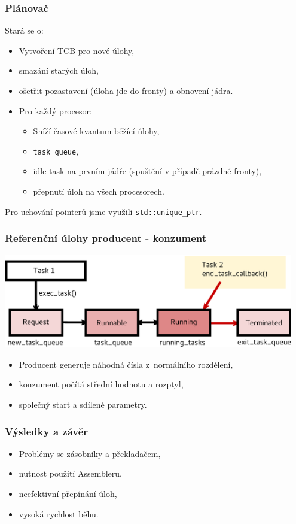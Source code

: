\documentclass{beamer}
\begin{document}
\begin{frame}
\frametitle{Plánovač}

Stará se o:
\begin{itemize}
  \item Vytvoření TCB pro nové úlohy,
  \item smazání starých úloh,
  \item ošetřit pozastavení (úloha jde do fronty) a obnovení jádra.
  \item Pro každý procesor:
  \begin{itemize}
    \item Sníží časové kvantum běžící úlohy,
    \item \texttt{task\_queue},
    \item idle task na prvním jádře (spuštění v případě prázdné fronty),
    \item přepnutí úloh na všech procesorech.
  \end{itemize}

\end{itemize}
Pro uchování pointerů jsme využili \texttt{std::unique\_ptr}.
\end{frame}

\begin{frame} %

\frametitle{Referenční úlohy producent - konzument}

\includegraphics[width=0.95\textwidth]{obrazky/task_cycle.eps}
  
  \begin{itemize}
    \item Producent generuje náhodná čísla z~normálního rozdělení,
    \item konzument počítá střední hodnotu a rozptyl,
    \item společný start a sdílené parametry.
  \end{itemize}

\end{frame}

\begin{frame} 
\frametitle{Výsledky a závěr}

  \begin{itemize}
    \item Problémy se zásobníky a překladačem,
    \item nutnost použití Assembleru,
    \item neefektivní přepínání úloh,
    \item vysoká rychlost běhu.
  \end{itemize}


\end{frame}
\end{document}
